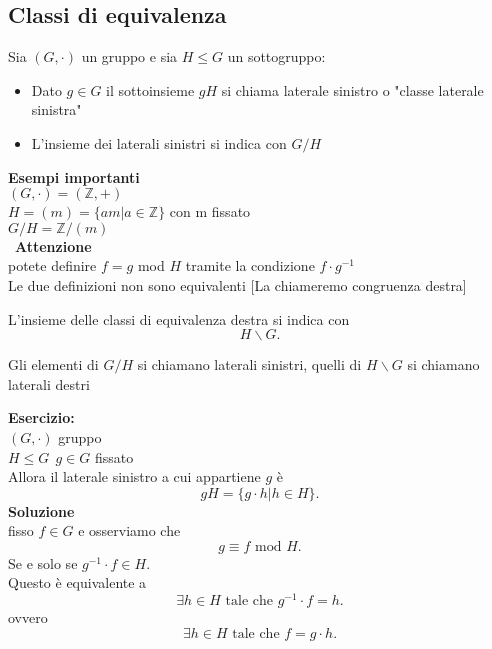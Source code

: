 \documentclass[12px]{article}
\begin{document}
\subsection{Classi di equivalenza}
	\begin{nota}
		Sia $(G,\cdot)$ un gruppo e sia $H\leq G$ un sottogruppo:\\
	\begin{itemize}
		\item Dato $g\in G$ il sottoinsieme  $gH$ si chiama laterale sinistro o "classe laterale sinistra"
		\item L'insieme dei laterali sinistri si indica con $G/H$
	\end{itemize}
	\end{nota}
	\textbf{Esempi importanti}\\
	$(G,\cdot) = (\mathbb Z, +)$\\
	$H = (m) = \lbrace a m | a\in \mathbb Z\rbrace$ con m fissato\\
	 $G/H = \mathbb Z/(m)$ \\\
	 \textbf{Attenzione}\\
	 potete definire $f = g$ mod $H$ tramite la condizione  $f\cdot g^{-1}$ \\
	 Le due definizioni non sono equivalenti [La chiameremo congruenza destra]\\
	 \begin{nota}
	L'insieme delle classi di equivalenza destra si indica con
	\[
		H\backslash G
	.\] 
	 \end{nota}
	 \begin{defi}
	 	Gli elementi di $G/H$ si chiamano laterali sinistri, quelli di  $H\backslash G$ si chiamano laterali destri
	 \end{defi}
	 \textbf{Esercizio:}\\
	 $(G,\cdot)$ gruppo\\
	 $H\leq G \ \ g\in G$ fissato\\
	 Allora il laterale sinistro a cui appartiene  $g$ è\\ \[
	 gH = \lbrace g\cdot h | h\in H\rbrace
	 .\] 
	 \textbf{Soluzione}\\
	 fisso $f\in G$ e osserviamo che  \[
		 g\equiv f \text{ mod } H
	 .\] 
	 Se e solo se $g^{-1}\cdot f\in H$.\\
	 Questo è equivalente a 
	  \[
		  \exists h\in H \text{ tale che } g^{-1}\cdot f=h
	 .\] 
	 ovvero
	 \[
		 \exists h\in H \text{ tale che } f = g\cdot h
	 .\] 
	 \ \\ \hline \ \\ 
\end{document}
